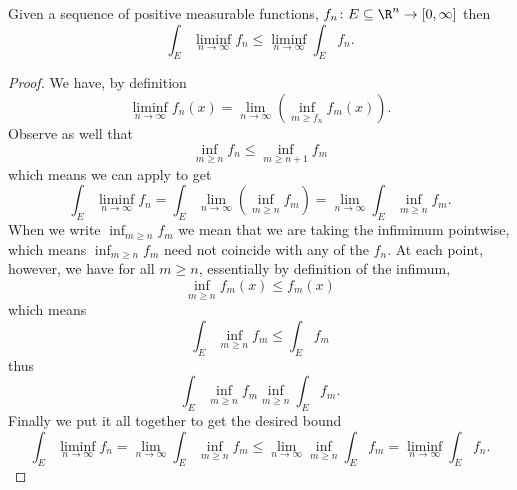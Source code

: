 \documentclass[12pt,oneside]{book}
\begin{document}
\begin{theorem}\label{theo:Fatou}
	Given a sequence of positive measurable functions, \( f_n \colon E \subseteq \R^n \to [0,
	\infty] \) then
	\begin{equation*}
		\int_E \liminf_{n \to \infty} f_n \leq \liminf_{n \to \infty} \int_E f_n.
	\end{equation*}
\end{theorem}
\begin{proof}
	We have, by definition
	\begin{equation*}
		\liminf_{n \to \infty} f_n(x) = \lim_{n \to \infty} \left(\inf_{m \geq f_n}
		f_m(x)\right).
	\end{equation*}
	Observe as well that 
	\begin{equation*}
		\inf_{m \geq n}f_n \leq \inf_{m \geq n+1}f_{m}
	\end{equation*}
	which means we can apply  to get
	\begin{equation*}
		\int_E \liminf_{n \to \infty} f_n = \int_{E} \lim_{n \to \infty} \left(\inf_{m \geq n}
		f_m\right) = \lim_{n \to \infty} \int_E \inf_{m \geq n} f_m.
	\end{equation*}
	When we write \( \inf_{m \geq n} f_m \) we mean	that we are taking the infimimum
	pointwise, which means \( \inf_{m \geq n} f_m \) need not coincide with any of the \( f_n
	\). At each point, however, we have for all \( m \geq n \), essentially by definition of
	the infimum,
	\begin{equation*}
		\inf_{m \geq n} f_m(x) \leq f_m(x)
	\end{equation*}
	which means
	\begin{equation*}
		\int_E \inf_{m \geq n} f_m \leq \int_{E} f_m
	\end{equation*}
	thus
	\begin{equation*}
		\int_E \inf_{m \geq n} f_m \inf_{m \geq n} \int_E f_m.
	\end{equation*}
	Finally we put it all together to get the desired bound
	\begin{equation*}
		\int_E \liminf_{n \to \infty} f_n = \lim_{n \to \infty} \int_E \inf_{m \geq n} f_m
		\leq \lim_{n \to \infty} \inf_{m \geq n} \int_E f_m = \liminf_{n \to \infty} \int_E
		f_n.
	\end{equation*}
\end{proof}
\end{document}
